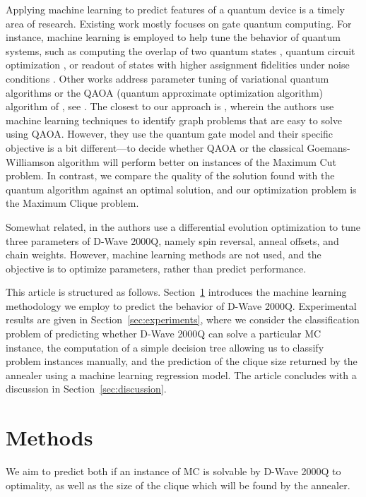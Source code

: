 \documentclass[a4paper,11pt]{article}
\begin{document}
Applying machine learning to predict features of a quantum device is a timely area of research. Existing work mostly focuses on gate quantum computing. For instance, machine learning is employed to help tune the behavior of quantum systems, such as computing the overlap of two quantum states \cite{Cincio2018}, quantum circuit optimization \cite{Verdon2019, Fosel2021}, or readout of states with higher assignment fidelities under noise conditions \cite{Magesan2015}. Other works address parameter tuning of variational quantum algorithms \cite{Rivera2021} or the QAOA (quantum approximate optimization algorithm) algorithm of \cite{farhi2017quantum}, see \cite{Wauters2020}. The closest to our approach is \cite{Moussa2020}, wherein the authors use machine learning techniques to identify graph problems that are easy to solve using QAOA. However, they use the quantum gate model and their specific objective is a bit different---to decide whether QAOA or the classical Goemans-Williamson algorithm will perform better on instances of the Maximum Cut problem. In contrast, we compare the quality of the solution found with the quantum algorithm against an optimal solution, and our optimization problem is the Maximum Clique problem.

Somewhat related, in \cite{spin-reversal, Barbosa} the authors use a differential evolution optimization to tune three parameters of D-Wave 2000Q, namely spin reversal, anneal offsets, and chain weights. However, machine learning methods are not used, and the objective is to optimize parameters, rather than predict performance.

This article is structured as follows. Section~\ref{sec:methods} introduces the machine learning methodology we employ to predict the behavior of D-Wave 2000Q. Experimental results are given in Section~\ref{sec:experiments}, where we consider the classification problem of predicting whether D-Wave 2000Q can solve a particular MC instance, the computation of a simple decision tree allowing us to classify problem instances manually, and the prediction of the clique size returned by the annealer using a machine learning regression model. The article concludes with a discussion in Section~\ref{sec:discussion}.



\section{Methods}
\label{sec:methods}
We aim to predict both if an instance of MC is solvable by D-Wave 2000Q to optimality, as well as the size of the clique which will be found by the annealer.
\end{document}
